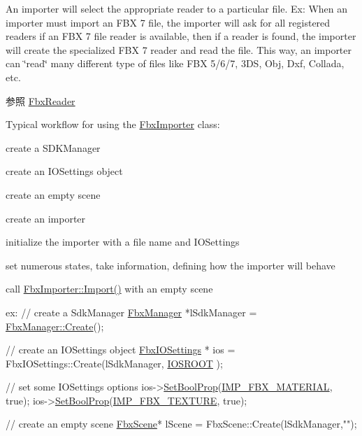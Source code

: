 An importer will select the appropriate reader to a particular file. Ex\+: When an importer must import an F\+BX 7 file, the importer will ask for all registered readers if an F\+BX 7 file reader is available, then if a reader is found, the importer will create the specialized F\+BX 7 reader and read the file. This way, an importer can \char`\"{}read\char`\"{} many different type of files like F\+BX 5/6/7, 3\+DS, Obj, Dxf, Collada, etc. \begin{DoxySeeAlso}{参照}
\hyperlink{class_fbx_reader}{Fbx\+Reader}
\end{DoxySeeAlso}
Typical workflow for using the \hyperlink{class_fbx_importer}{Fbx\+Importer} class\+:
\begin{DoxyEnumerate}
\item create a S\+D\+K\+Manager
\item create an I\+O\+Settings object
\item create an empty scene
\item create an importer
\item initialize the importer with a file name and I\+O\+Settings
\item set numerous states, take information, defining how the importer will behave
\item call \hyperlink{class_fbx_importer_a1c5a7f9ee8a6952c1e039065cfa09659}{Fbx\+Importer\+::\+Import()} with an empty scene 
\begin{DoxyCode}
ex:
\textcolor{comment}{// create a SdkManager}
\hyperlink{class_fbx_manager}{FbxManager} *lSdkManager = \hyperlink{class_fbx_manager_af51cafc0f34f17d497f7921d847a4dd4}{FbxManager::Create}();

\textcolor{comment}{// create an IOSettings object}
\hyperlink{class_fbx_i_o_settings}{FbxIOSettings} * ios = FbxIOSettings::Create(lSdkManager, \hyperlink{fbxiosettingspath_8h_a57a5e54b72d0f2936d5ee84d8f510a0a}{IOSROOT} );

\textcolor{comment}{// set some IOSettings options }
ios->\hyperlink{class_fbx_i_o_settings_ad2c660ef846b66dcf569079299391745}{SetBoolProp}(\hyperlink{fbxiosettingspath_8h_a01f89e0767514be153d2961943cd7300}{IMP\_FBX\_MATERIAL}, \textcolor{keyword}{true});
ios->\hyperlink{class_fbx_i_o_settings_ad2c660ef846b66dcf569079299391745}{SetBoolProp}(\hyperlink{fbxiosettingspath_8h_a33796a216d882cfd0fcc11dbab51328c}{IMP\_FBX\_TEXTURE},  \textcolor{keyword}{true});

\textcolor{comment}{// create an empty scene}
\hyperlink{class_fbx_scene}{FbxScene}* lScene = FbxScene::Create(lSdkManager,\textcolor{stringliteral}{""});


\end{DoxyCode}
\end{DoxyEnumerate}
